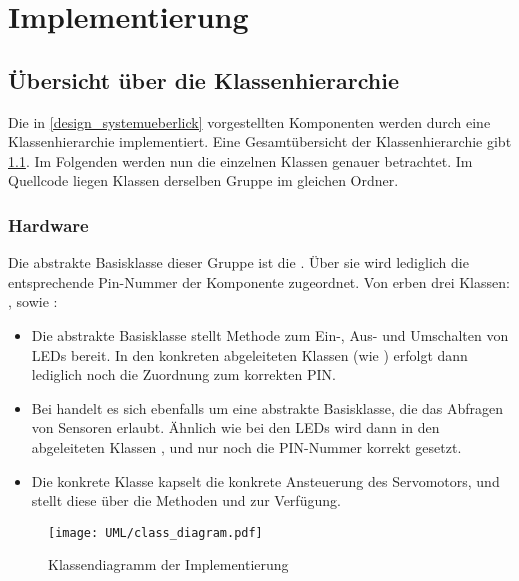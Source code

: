 \chapter{Implementierung}\label{k_implementierung}
\section{Übersicht über die Klassenhierarchie}
Die in \cref{design_systemueberlick} vorgestellten Komponenten werden durch eine Klassenhierarchie implementiert.
Eine Gesamtübersicht der Klassenhierarchie gibt \cref{uml:class_diagram}.
Im Folgenden werden nun die einzelnen Klassen genauer betrachtet.
Im Quellcode liegen Klassen derselben Gruppe im gleichen Ordner.

\subsection{Hardware}
Die abstrakte Basisklasse dieser Gruppe ist die .
Über sie wird lediglich die entsprechende Pin-Nummer der Komponente zugeordnet.
Von  erben drei Klassen: ,  sowie :

\begin{itemize}
	\item Die abstrakte Basisklasse  stellt Methode zum Ein-, Aus- und Umschalten von LEDs bereit.
In den konkreten abgeleiteten Klassen (wie ) erfolgt dann lediglich noch die Zuordnung zum korrekten PIN.
	\item Bei  handelt es sich ebenfalls um eine abstrakte Basisklasse, die das Abfragen von Sensoren erlaubt.
Ähnlich wie bei den LEDs wird dann in den abgeleiteten Klassen ,  und  nur noch die PIN-Nummer korrekt gesetzt.
	\item Die konkrete Klasse  kapselt die konkrete Ansteuerung des Servomotors, und stellt diese über die Methoden  und  zur Verfügung.
\end{itemize}

\begin{figure}[hb] \centering
	\texttt{[image: UML/class\_diagram.pdf]}
	\caption{Klassendiagramm der Implementierung}
	\label{uml:class_diagram}
\end{figure}

